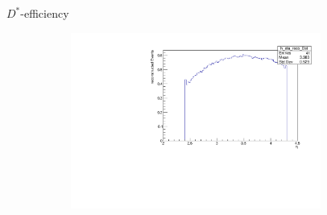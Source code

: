 \documentclass[11pt]{beamer}
\begin{document}
\begin{frame}{$D^*$-efficiency}
\begin{figure}
\begin{subfigure}{0.45\textwidth}
\end{subfigure}
\begin{subfigure}{0.45\textwidth}
\includegraphics[width=0.9\textwidth]{up_pdf/h_eta_reco_Dst.pdf}
\end{subfigure}
\end{figure}
\end{frame}
\end{document}
